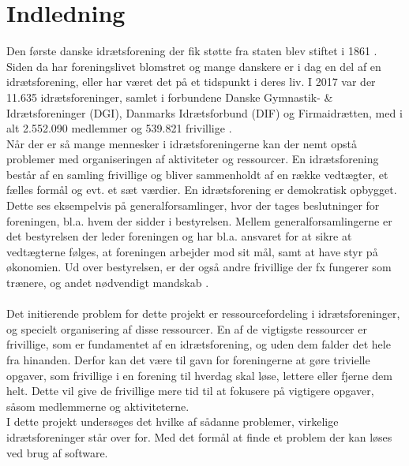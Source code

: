 \chapter{Indledning}\label{ch:introduction}
Den første danske idrætsforening der fik støtte fra staten blev stiftet i 1861 \cite{difhistorie}.\\
Siden da har foreningslivet blomstret og mange danskere er i dag en del af en idrætsforening, eller har været det på et tidspunkt i deres liv. I 2017 var der 11.635 idrætsforeninger, samlet i forbundene Danske Gymnastik- & Idrætsforeninger (DGI), Danmarks Idrætsforbund (DIF) og Firmaidrætten, med i alt 2.552.090 medlemmer og 539.821 frivillige \cite{fester2018}.
\\
Når der er så mange mennesker i idrætsforeningerne kan der nemt opstå problemer med organiseringen af aktiviteter og ressourcer. En idrætsforening består af en samling frivillige og bliver sammenholdt af en række vedtægter, et fælles formål og evt. et sæt værdier. En idrætsforening er demokratisk opbygget. Dette ses eksempelvis på generalforsamlinger, hvor der tages beslutninger for foreningen, bl.a. hvem der sidder i bestyrelsen. Mellem generalforsamlingerne er det bestyrelsen der leder foreningen og har bl.a. ansvaret for at sikre at vedtægterne følges, at foreningen arbejder mod sit mål, samt at have styr på økonomien. Ud over bestyrelsen, er der også andre frivillige der fx fungerer som trænere, og andet nødvendigt mandskab \citep{DGI} \citep{bestyrelsen}.
\\
\\
Det initierende problem for dette projekt er ressourcefordeling i idrætsforeninger, og specielt organisering af disse ressourcer.
En af de vigtigste ressourcer er frivillige, som er fundamentet af en idrætsforening, og uden dem falder det hele fra hinanden. Derfor kan det være til gavn for foreningerne at gøre trivielle opgaver, som frivillige i en forening til hverdag skal løse, lettere eller fjerne dem helt. Dette vil give de frivillige mere tid til at fokusere på vigtigere opgaver, såsom medlemmerne og aktiviteterne.
\\
I dette projekt undersøges det hvilke af sådanne problemer, virkelige idrætsforeninger står over for. Med det formål at finde et problem der kan løses ved brug af software.


